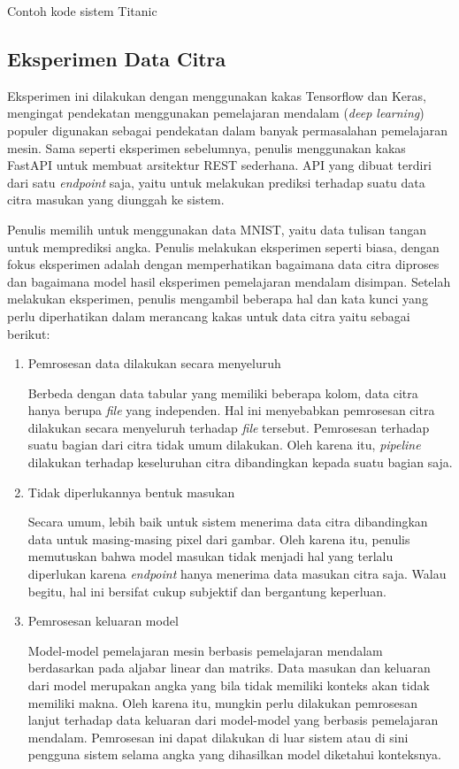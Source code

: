 \begin{listing}[H]
	\caption{Contoh kode sistem Titanic}
	\label{listing:15}
\end{listing}

\subsection{Eksperimen Data Citra}
Eksperimen ini dilakukan dengan menggunakan kakas Tensorflow dan Keras, mengingat pendekatan menggunakan pemelajaran mendalam (\textit{deep learning}) populer digunakan sebagai pendekatan dalam banyak permasalahan pemelajaran mesin.
Sama seperti eksperimen sebelumnya, penulis menggunakan kakas FastAPI untuk membuat arsitektur REST sederhana.
API yang dibuat terdiri dari satu \textit{endpoint} saja, yaitu untuk melakukan prediksi terhadap suatu data citra masukan yang diunggah ke sistem.

Penulis memilih untuk menggunakan data MNIST, yaitu data tulisan tangan untuk memprediksi angka.
Penulis melakukan eksperimen seperti biasa, dengan fokus eksperimen adalah dengan memperhatikan bagaimana data citra diproses dan bagaimana model hasil eksperimen pemelajaran mendalam disimpan.
Setelah melakukan eksperimen, penulis mengambil beberapa hal dan kata kunci yang perlu diperhatikan dalam merancang kakas untuk data citra yaitu sebagai berikut:

\begin{enumerate}
	\item Pemrosesan data dilakukan secara menyeluruh
	
	Berbeda dengan data tabular yang memiliki beberapa kolom, data citra hanya berupa \textit{file} yang independen.
	Hal ini menyebabkan pemrosesan citra dilakukan secara menyeluruh terhadap \textit{file} tersebut.
	Pemrosesan terhadap suatu bagian dari citra tidak umum dilakukan.
	Oleh karena itu, \textit{pipeline} dilakukan terhadap keseluruhan citra dibandingkan kepada suatu bagian saja. 

	\item Tidak diperlukannya bentuk masukan
	
	Secara umum, lebih baik untuk sistem menerima data citra dibandingkan data untuk masing-masing pixel dari gambar.
	Oleh karena itu, penulis memutuskan bahwa model masukan tidak menjadi hal yang terlalu diperlukan karena \textit{endpoint} hanya menerima data masukan citra saja.
	Walau begitu, hal ini bersifat cukup subjektif dan bergantung keperluan.
	
	\item Pemrosesan keluaran model
	
	Model-model pemelajaran mesin berbasis pemelajaran mendalam berdasarkan pada aljabar linear dan matriks.
	Data masukan dan keluaran dari model merupakan angka yang bila tidak memiliki konteks akan tidak memiliki makna.
	Oleh karena itu, mungkin perlu dilakukan pemrosesan lanjut terhadap data keluaran dari model-model yang berbasis pemelajaran mendalam.
	Pemrosesan ini dapat dilakukan di luar sistem atau di sini pengguna sistem selama angka yang dihasilkan model diketahui konteksnya.

\end{enumerate}

